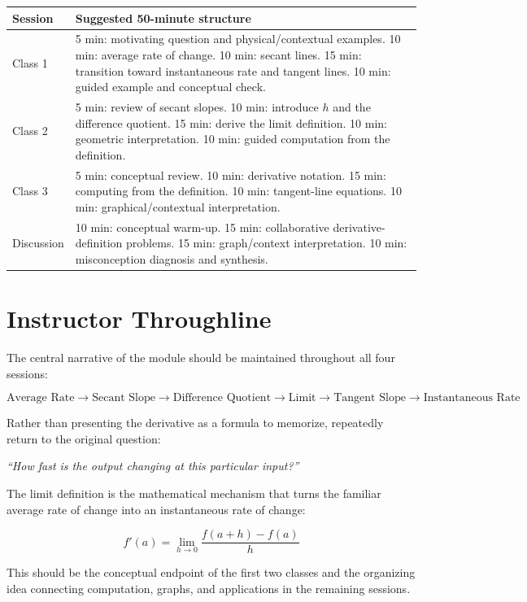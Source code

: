 \documentclass{article}
\begin{document}
\begin{longtable}{p{}p{}}
\textbf{Session} & \textbf{Suggested 50-minute structure} \\ \hline
Class 1 &
5 min: motivating question and physical/contextual examples.
10 min: average rate of change.
10 min: secant lines.
15 min: transition toward instantaneous rate and tangent lines.
10 min: guided example and conceptual check. \\[6pt]

Class 2 &
5 min: review of secant slopes.
10 min: introduce $h$ and the difference quotient.
15 min: derive the limit definition.
10 min: geometric interpretation.
10 min: guided computation from the definition. \\[6pt]

Class 3 &
5 min: conceptual review.
10 min: derivative notation.
15 min: computing from the definition.
10 min: tangent-line equations.
10 min: graphical/contextual interpretation. \\[6pt]

Discussion &
10 min: conceptual warm-up.
15 min: collaborative derivative-definition problems.
15 min: graph/context interpretation.
10 min: misconception diagnosis and synthesis.
\end{longtable}

\section*{Instructor Throughline}

The central narrative of the module should be maintained throughout all four sessions:

\begin{center}
\[
\boxed{
\text{Average Rate}
\rightarrow
\text{Secant Slope}
\rightarrow
\text{Difference Quotient}
\rightarrow
\text{Limit}
\rightarrow
\text{Tangent Slope}
\rightarrow
\text{Instantaneous Rate}
}
\]
\end{center}

Rather than presenting the derivative as a formula to memorize, repeatedly return to the original question:

\begin{center}
\emph{``How fast is the output changing at this particular input?''}
\end{center}

The limit definition is the mathematical mechanism that turns the familiar average rate of change into an instantaneous rate of change:

\[
\boxed{
f'(a)
=
\lim_{h\to0}
\frac{f(a+h)-f(a)}{h}
}
\]

This should be the conceptual endpoint of the first two classes and the organizing idea connecting computation, graphs, and applications in the remaining sessions.
\end{document}
